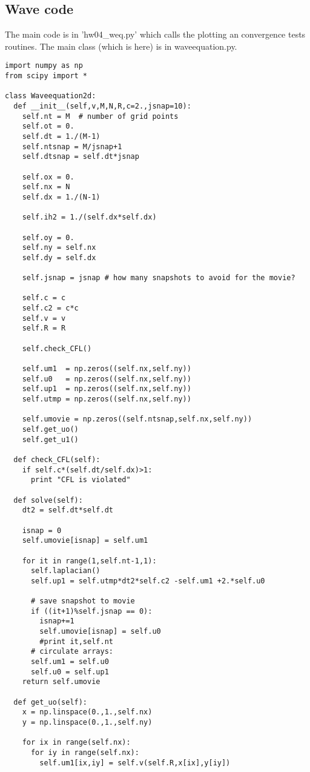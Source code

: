 \documentclass[10pt]{article}
\begin{document}
\subsection{Wave code}
The main code is in 'hw04\_weq.py' which calls the plotting an convergence tests routines.
The main class (which is here) is in waveequation.py.

\begin{verbatim}
import numpy as np
from scipy import *

class Waveequation2d:
  def __init__(self,v,M,N,R,c=2.,jsnap=10):
    self.nt = M  # number of grid points
    self.ot = 0.
    self.dt = 1./(M-1)
    self.ntsnap = M/jsnap+1
    self.dtsnap = self.dt*jsnap

    self.ox = 0.
    self.nx = N
    self.dx = 1./(N-1)

    self.ih2 = 1./(self.dx*self.dx)

    self.oy = 0.
    self.ny = self.nx
    self.dy = self.dx

    self.jsnap = jsnap # how many snapshots to avoid for the movie?

    self.c = c
    self.c2 = c*c
    self.v = v
    self.R = R

    self.check_CFL()

    self.um1  = np.zeros((self.nx,self.ny))    
    self.u0   = np.zeros((self.nx,self.ny))    
    self.up1  = np.zeros((self.nx,self.ny)) 
    self.utmp = np.zeros((self.nx,self.ny)) 
    
    self.umovie = np.zeros((self.ntsnap,self.nx,self.ny)) 
    self.get_uo()
    self.get_u1()

  def check_CFL(self):
    if self.c*(self.dt/self.dx)>1:
      print "CFL is violated"

  def solve(self):
    dt2 = self.dt*self.dt

    isnap = 0
    self.umovie[isnap] = self.um1
 
    for it in range(1,self.nt-1,1):
      self.laplacian()
      self.up1 = self.utmp*dt2*self.c2 -self.um1 +2.*self.u0

      # save snapshot to movie
      if ((it+1)%self.jsnap == 0):
        isnap+=1
        self.umovie[isnap] = self.u0
        #print it,self.nt 
      # circulate arrays:
      self.um1 = self.u0
      self.u0 = self.up1 
    return self.umovie

  def get_uo(self):
    x = np.linspace(0.,1.,self.nx)   
    y = np.linspace(0.,1.,self.ny)  

    for ix in range(self.nx):
      for iy in range(self.nx):
        self.um1[ix,iy] = self.v(self.R,x[ix],y[iy])


\end{verbatim}
\end{document}
